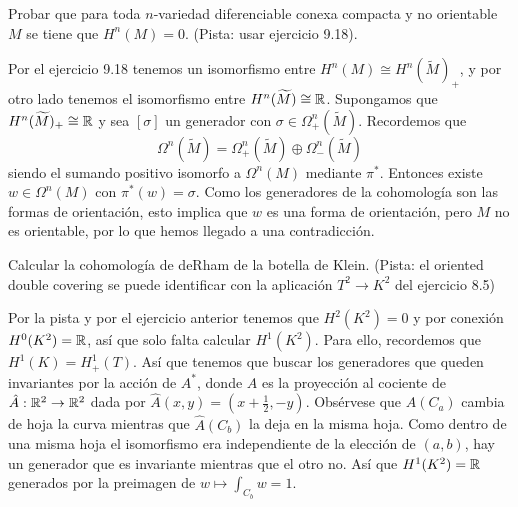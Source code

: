 \documentclass[twoside]{article}
\begin{document}
\begin{ejercicio}{10.4}
Probar que para toda $n$-variedad diferenciable conexa compacta y no orientable $M$ se tiene que $H^n(M)=0$. (Pista: usar ejercicio 9.18).
\end{ejercicio}
\begin{solucion}
Por el ejercicio 9.18 tenemos un isomorfismo entre $H^n(M)\cong H^n(\widetilde{M})_+$, y por otro lado tenemos el isomorfismo entre $H^n(\widetilde{M})\cong\mathbb{R}$. Supongamos que $H^n(\widetilde{M})_+\cong \mathbb{R}$ y sea $[\sigma]$ un generador con $\sigma\in\Omega_+^n(\widetilde{M})$. Recordemos que
\[
\Omega^n(\widetilde{M})=\Omega_+^n(\widetilde{M})\oplus \Omega^n_-(\widetilde{M})
\] 
siendo el sumando positivo isomorfo a $\Omega^n(M)$ mediante $\pi^*$. Entonces existe $w\in\Omega^n(M)$ con $\pi^*(w)=\sigma$. Como los generadores de la cohomología son las formas de orientación, esto implica que $w$ es una forma de orientación, pero $M$ no es orientable, por lo que hemos llegado a una contradicción.

\end{solucion}

\newpage

\begin{ejercicio}{10.5}
Calcular la cohomología de deRham de la botella de Klein. (Pista: el oriented double covering se puede identificar con la aplicación $T^2\to K^2$ del ejercicio 8.5)
\end{ejercicio}
\begin{solucion}
Por la pista y por el ejercicio anterior tenemos que $H^2(K^2)=0$ y por conexión $H^0(K^2)=\mathbb{R}$, así que solo falta calcular $H^1(K^2)$. Para ello, recordemos que $H^1(K)=H_+^1(T)$. Así que tenemos que buscar los generadores que queden invariantes por la acción de $A^*$, donde $A$ es la proyección al cociente de $\hat{A}:\mathbb{R}^2\to\mathbb{R}^2$ dada por $\hat{A}(x,y)=(x+\frac{1}{2},-y)$. Obsérvese que $\hat{A}(C_a)$ cambia de hoja la curva mientras que $\hat{A}(C_b)$ la deja en la misma hoja. Como dentro de una misma hoja el isomorfismo era independiente de la elección de $(a,b)$, hay un generador que es invariante mientras que el otro no. Así que $H^1(K^2)=\mathbb{R}$ generados por la preimagen de $w\mapsto \int_{C_b} w=1$. 
\end{solucion}
\newpage
\end{document}
